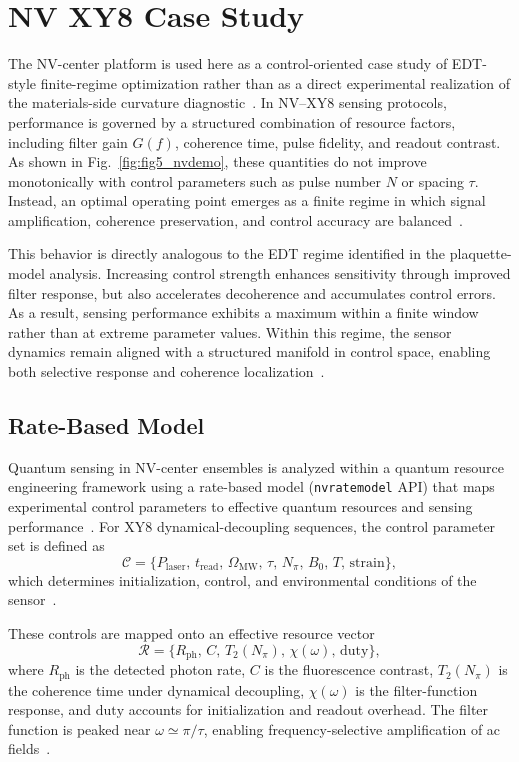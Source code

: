 \section{NV XY8 Case Study}

The NV-center platform is used here as a control-oriented case study of EDT-style finite-regime optimization rather than as a direct experimental realization of the materials-side curvature diagnostic~\cite{Degen2017,Barry2020}. In NV--XY8 sensing protocols, performance is governed by a structured combination of resource factors, including filter gain $G(f)$, coherence time, pulse fidelity, and readout contrast. As shown in Fig.~\ref{fig:fig5_nvdemo}, these quantities do not improve monotonically with control parameters such as pulse number $N$ or spacing $\tau$. Instead, an optimal operating point emerges as a finite regime in which signal amplification, coherence preservation, and control accuracy are balanced~\cite{Casola2018}.

This behavior is directly analogous to the EDT regime identified in the plaquette-model analysis. Increasing control strength enhances sensitivity through improved filter response, but also accelerates decoherence and accumulates control errors. As a result, sensing performance exhibits a maximum within a finite window rather than at extreme parameter values. Within this regime, the sensor dynamics remain aligned with a structured manifold in control space, enabling both selective response and coherence localization~\cite{Degen2017,Barry2020}.

\subsection{Rate-Based Model}

Quantum sensing in NV-center ensembles is analyzed within a quantum resource engineering framework using a rate-based model (\texttt{nvratemodel} API) that maps experimental control parameters to effective quantum resources and sensing performance~\cite{NVRateModel2023,Degen2017,Barry2020}. For XY8 dynamical-decoupling sequences, the control parameter set is defined as
\begin{equation}
\mathcal{C} = \{P_{\mathrm{laser}},\, t_{\mathrm{read}},\, \Omega_{\mathrm{MW}},\, \tau,\, N_{\pi},\, B_0,\, T,\, \mathrm{strain}\},
\end{equation}
which determines initialization, control, and environmental conditions of the sensor~\cite{Casola2018}.

These controls are mapped onto an effective resource vector
\begin{equation}
\mathcal{R} = \{R_{\mathrm{ph}},\, C,\, T_2(N_{\pi}),\, \chi(\omega),\, \mathrm{duty}\},
\end{equation}
where $R_{\mathrm{ph}}$ is the detected photon rate, $C$ is the fluorescence contrast, $T_2(N_{\pi})$ is the coherence time under dynamical decoupling, $\chi(\omega)$ is the filter-function response, and $\mathrm{duty}$ accounts for initialization and readout overhead. The filter function is peaked near $\omega \simeq \pi/\tau$, enabling frequency-selective amplification of ac fields~\cite{Cywinski2008}.

